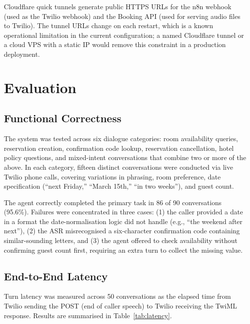 \documentclass[conference]{IEEEtran}
\begin{document}
Cloudflare quick tunnels generate public HTTPS URLs for the n8n webhook
(used as the Twilio webhook) and the Booking API (used for serving audio files
to Twilio). The tunnel URLs change on each restart, which is a known operational
limitation in the current configuration; a named Cloudflare tunnel or a cloud
VPS with a static IP would remove this constraint in a production deployment.


\section{Evaluation}
\label{sec:eval}

\subsection{Functional Correctness}

The system was tested across six dialogue categories: room availability queries,
reservation creation, confirmation code lookup, reservation cancellation, hotel
policy questions, and mixed-intent conversations that combine two or more of
the above. In each category, fifteen distinct conversations were conducted
via live Twilio phone calls, covering variations in phrasing, room preference,
date specification (``next Friday,'' ``March 15th,'' ``in two weeks''), and
guest count.

The agent correctly completed the primary task in 86 of 90 conversations (95.6\%).
Failures were concentrated in three cases: (1) the caller provided a date in
a format the date-normalisation logic did not handle (e.g., ``the weekend after
next''), (2) the ASR misrecognised a six-character confirmation code containing
similar-sounding letters, and (3) the agent offered to check availability
without confirming guest count first, requiring an extra turn to collect the
missing value.

\subsection{End-to-End Latency}

Turn latency was measured across 50 conversations as the elapsed time from
Twilio sending the POST (end of caller speech) to Twilio receiving the TwiML
response. Results are summarised in Table~\ref{tab:latency}.
\end{document}
